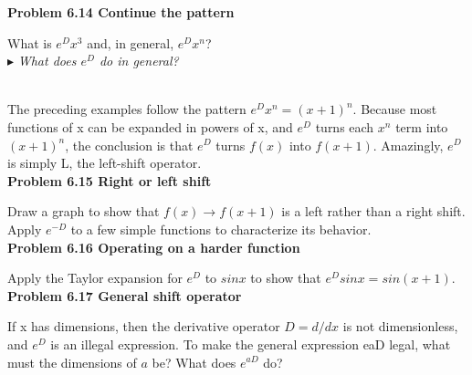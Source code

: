 \documentclass[a4paper]{article}
\begin{document}
\pagestyle{fancy}


\renewcommand{\headrulewidth}{0pt}
\fancyhf{}



\hangindent=5cm \large{{\bf Problem 6.14 \hspace{0.5cm} Continue the pattern}


\hangindent=3cm \vspace{0.1cm}
What is $e^Dx^3$ and, in general, $e^Dx^n$?
\\

\noindent $\blacktriangleright$ \textit{What does $e^D$ do in general?}}
\\

\noindent \Large {The preceding examples follow the pattern $e^Dx^n = (x+1)^n$. Because most
functions of x can be expanded in powers of x, and $e^D$ turns each $x^n$ term
into $(x+1)^n$, the conclusion is that $e^D$ turns $f(x)$ into $f(x+1)$. Amazingly,
$e^D$ is simply L, the left-shift operator.}
\\

\hangindent=3cm \large{{\bf Problem 6.15 \hspace{0.5cm} Right or left shift}}
\vspace{0.1cm}

 \large{Draw a graph to show that $f(x) → f(x + 1)$ is a left rather than a right shift.} 
\hangindent=0.5cm \vspace{0.1cm} Apply $e^{−D}$ to a few simple functions to characterize its behavior.
\\

\hangindent=5cm \large{{\bf Problem 6.16 \hspace{0.5cm} Operating on a harder function}}
\vspace{0.1cm}

Apply the Taylor expansion for $e^D$ to $sin{x}$ to show that $e^Dsin x = sin(x + 1)$.
\\

\large{{\bf Problem 6.17 \hspace{0.5cm} General shift operator}}


\hangindent=0.5cm If x has dimensions, then the derivative operator $D = d/dx$ is not dimensionless,
and $e^D$ is an illegal expression. To make the general expression eaD legal, what
must the dimensions of $a$ 
be? What does $e^{aD}$ do?
\\
\\
\end{document}
